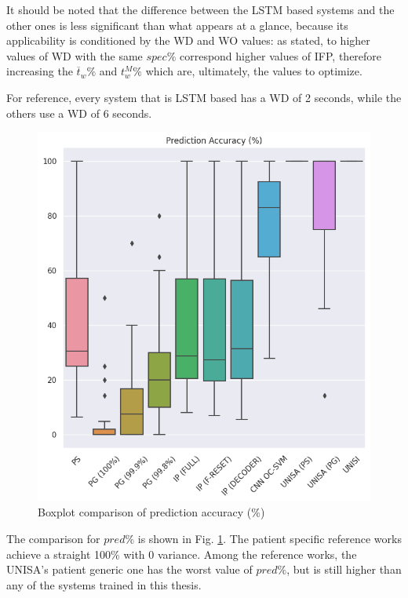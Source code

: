 It should be noted that the difference between the \gls{LSTM} based systems and the other ones is less significant than what appears at a glance, because its applicability is conditioned by the \gls{WD} and \gls{WO} values: as stated, to higher values of \gls{WD} with the same $spec\%$ correspond higher values of \gls{IFP}, therefore increasing the $\overline{t}_w\%$ and $t_w^M\%$ which are, ultimately, the values to optimize.

For reference, every system that is \gls{LSTM} based has a \gls{WD} of 2 seconds, while the others use a \gls{WD} of 6 seconds.

\begin{figure}[ht]
    \centering
    \includegraphics[width=1.0\textwidth]{images/Experimental-validation/boxplot_pred.png}
    \caption{Boxplot comparison of prediction accuracy (\%)}
    \label{fig:boxplot_pred}
\end{figure}

The comparison for $pred\%$ is shown in Fig. \ref{fig:boxplot_pred}. The patient specific reference works achieve a straight 100\% with 0 variance. Among the reference works, the UNISA's patient generic one has the worst value of $pred\%$, but is still higher than any of the systems trained in this thesis.

